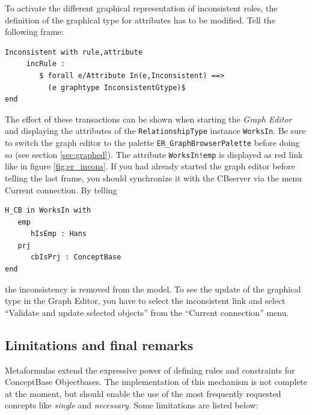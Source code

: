 To activate the different graphical representation of inconsistent roles,
the definition of the graphical type for attributes has to be modified.
Tell the following frame:

{\small
\begin{verbatim}
Inconsistent with rule,attribute
     incRule :
        $ forall e/Attribute In(e,Inconsistent) ==>
          (e graphtype InconsistentGtype)$
end
\end{verbatim}
}

The effect of these transactions can be shown when starting the
{\em Graph Editor} and displaying the attributes of the {\tt RelationshipType}
instance {\tt WorksIn}. Be sure to switch the graph editor to the palette
{\tt ER\_GraphBrowserPalette}
before doing so (see section \ref{sec:graphed}). The attribute
{\tt WorksIn!emp} is displayed as red link like in figure \ref{fig:er_incons}.
If you had already started the graph editor before telling the last frame, you should
synchronize it with the CBserver via the menu Current connection.
By telling

{\small
\begin{verbatim}
H_CB in WorksIn with
   emp
      hIsEmp : Hans
   prj
      cbIsPrj : ConceptBase
end
\end{verbatim}
}

the inconsistency is removed from the model. To see the update
of the graphical type in the Graph Editor, you have to select the
inconsistent link and select ``Validate and update selected objects''
from the ``Current connection'' menu.


\subsection{Limitations and final remarks}
Metaformulas extend the expressive power of defining rules
and constraints for  ConceptBase Objectbases. The implementation
of this mechanism is not complete at the moment, but should
enable the use of the most frequently requested concepts like {\em single} and
{\em necessary}. Some limitations are listed below:

